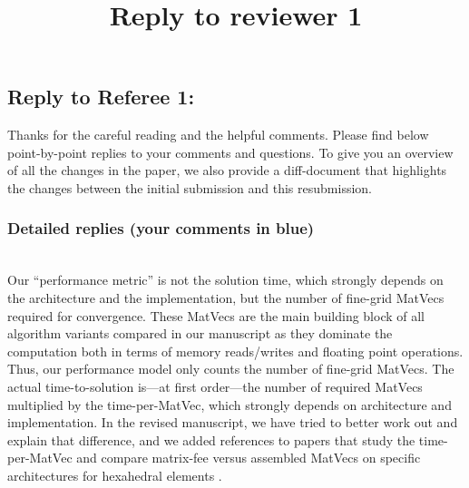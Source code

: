 \documentclass[12pt]{article}
\title{Reply to reviewer 1}
\newcommand{\todo}[1]{\noindent\emph{\textcolor{red}{Todo: #1\:}}}
\newcommand{\referee}[1]{\vspace{3ex}\noindent{\textcolor{blue}{#1}}\\[2ex]}
\begin{document}
\subsection*{Reply to Referee 1:}

Thanks for the careful reading and the helpful comments.
Please find below point-by-point replies to your comments and
questions. To give you an overview of all the changes in the paper, we
also provide a diff-document that highlights the changes between the
initial submission and this resubmission.

\subsubsection*{Detailed replies (your comments in blue)}

\referee{
Summary impression:\\[.2ex]
Given the interest in high-order methods and the notable cost of the
underlying solver for poisson-type problems in addition to the variety
of options, the core thesis of the manuscript is well-placed.  Yet,
the presentation of the numerics does not lead the reader to conclude
anything from the comparison --- ie, there are too many ways to
interpret the convergence based on iterations and the cost of the
methods.  The primary concern as stated in the Contributions section
was to address the "actual performance", but as it stands the results
do not attempt to answer this.  Indeed, actual timings are avoided
(and clearly stated this way), the performance model is not realistic
(also as stated, since it can vary from implementation and
architecture), and the iterations are not combined with the perceived
cost in a clear way.  Again, the targeted contributions of this
manuscript would be quite interesting, but the numerics and discussion
could be significantly improved to support many of the statements.}
\noindent
Our ``performance metric'' is not the solution time, which strongly
depends on the architecture and the implementation, but the number of
fine-grid MatVecs required for convergence. These MatVecs are the main
building block of all algorithm variants compared in our manuscript as
they dominate the computation both in terms of memory reads/writes and
floating point operations. Thus, our performance model only counts the
number of fine-grid MatVecs. The actual time-to-solution is---at first
order---the number of required MatVecs multiplied by the
time-per-MatVec, which strongly depends on architecture and
implementation. In the revised manuscript, we have tried to better
work out and explain that difference, and we added references to
papers that study the time-per-MatVec and compare matrix-fee versus
assembled MatVecs on specific architectures for hexahedral elements
\cite{ptatin3d,BursteddeGhattasGurnisEtAl08,DevilleFischerMund02}.
\end{document}
